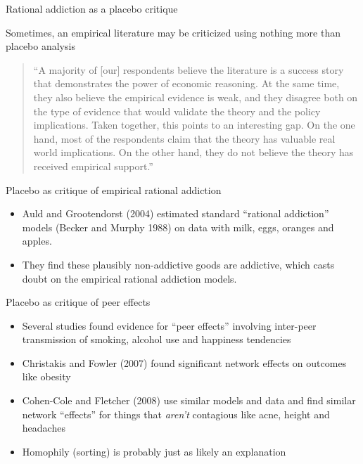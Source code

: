 \documentclass{beamer}
\begin{document}
\begin{frame}{Rational addiction as a placebo critique}


Sometimes, an empirical literature may be criticized using nothing more than placebo analysis

\begin{quote}``A majority of [our] respondents believe the literature is a success story that demonstrates the power of economic reasoning.  At the same time, they also believe the empirical evidence is weak, and they disagree both on the type of evidence that would validate the theory and the policy implications. Taken together, this points to an interesting gap.  On the one hand, most of the respondents claim that the theory has valuable real world implications.  On the other hand, they do not believe the theory has received empirical support.''
\end{quote}

\end{frame}

\begin{frame}{Placebo as critique of empirical rational addiction}

\begin{itemize}
	\item Auld and Grootendorst (2004) estimated standard ``rational addiction'' models (Becker and Murphy 1988) on data with milk, eggs, oranges and apples.  
	\item They find these plausibly non-addictive goods are addictive, which casts doubt on the empirical rational addiction models.
\end{itemize}

\end{frame}

\begin{frame}{Placebo as critique of peer effects}

\begin{itemize}
	\item Several studies found evidence for ``peer effects'' involving inter-peer transmission of smoking, alcohol use and happiness tendencies
	\item Christakis and Fowler (2007) found significant network effects on outcomes like obesity
	\item Cohen-Cole and Fletcher (2008) use similar models and data and find similar network ``effects'' for things that \emph{aren't} contagious like acne, height and headaches
	\item Homophily (sorting) is probably just as likely an explanation
\end{itemize}

\end{frame}
\end{document}
